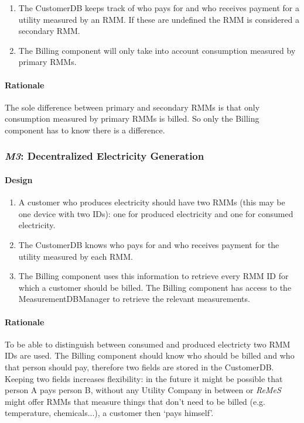 \documentclass[a4paper,10pt]{article}
\newcommand{\rem}{\emph{ReMeS}\xspace}
\begin{document}
\begin{enumerate}
	\item The CustomerDB keeps track of who pays for and who receives payment for a utility measured by an RMM. If these are undefined the RMM is considered a secondary RMM.
    \item The Billing component will only take into account consumption measured by primary RMMs.
\end{enumerate}

\paragraph{Rationale}
The sole difference between primary and secondary RMMs is that only consumption measured by primary RMMs is billed. So only the Billing component has to know there is a difference.


\subsubsection{\emph{M3}: Decentralized Electricity Generation}

\paragraph{Design}

\begin{enumerate}
	\item A customer who produces electricity should have two RMMs (this may be one device with two IDs): one for produced electricity and one for consumed electricity.
    \item The CustomerDB knows who pays for and who receives payment for the utility measured by each RMM.
    \item The Billing component uses this information to retrieve every RMM ID for which a customer should be billed. The Billing component has access to the MeasurementDBManager to retrieve the relevant measurements.
\end{enumerate}

\paragraph{Rationale} To be able to distinguish between consumed and produced electricty two RMM IDs are used. The Billing component should know who should be billed and who that person should pay, therefore two fields are stored in the CustomerDB. Keeping two fields increases flexibility: in the future it might be possible that person A pays person B, without any Utility Company in between or \rem might offer RMMs that measure things that don't need to be billed (e.g. temperature, chemicals...), a customer then `pays himself'.
\end{document}

